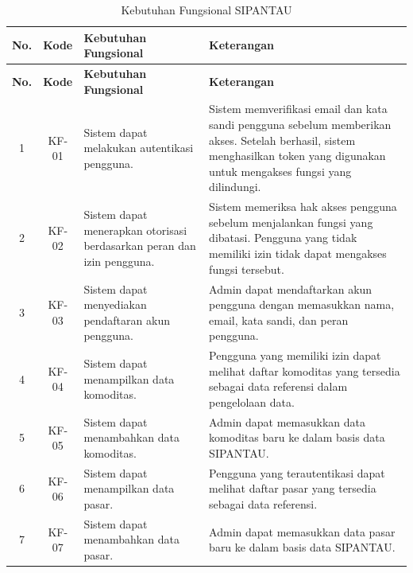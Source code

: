 \begin{longtable}{|c|c|p{3.7cm}|p{7.3cm}|}
    \caption{Kebutuhan Fungsional SIPANTAU}
    \label{tab:kebutuhan-fungsional} \\

    \hline
    \textbf{No.} &
    \textbf{Kode} &
    \textbf{Kebutuhan Fungsional} &
    \textbf{Keterangan} \\
    \hline
    \endfirsthead

    \hline
    \textbf{No.} &
    \textbf{Kode} &
    \textbf{Kebutuhan Fungsional} &
    \textbf{Keterangan} \\
    \hline
    \endhead

    1 & KF-01 &
    Sistem dapat melakukan autentikasi pengguna. &
    Sistem memverifikasi email dan kata sandi pengguna sebelum memberikan akses. Setelah berhasil, sistem menghasilkan token yang digunakan untuk mengakses fungsi yang dilindungi. \\ \hline

    2 & KF-02 &
    Sistem dapat menerapkan otorisasi berdasarkan peran dan izin pengguna. &
    Sistem memeriksa hak akses pengguna sebelum menjalankan fungsi yang dibatasi. Pengguna yang tidak memiliki izin tidak dapat mengakses fungsi tersebut. \\ \hline

    3 & KF-03 &
    Sistem dapat menyediakan pendaftaran akun pengguna. &
    Admin dapat mendaftarkan akun pengguna dengan memasukkan nama, email, kata sandi, dan peran pengguna. \\ \hline

    4 & KF-04 &
    Sistem dapat menampilkan data komoditas. &
    Pengguna yang memiliki izin dapat melihat daftar komoditas yang tersedia sebagai data referensi dalam pengelolaan data. \\ \hline

    5 & KF-05 &
    Sistem dapat menambahkan data komoditas. &
    Admin dapat memasukkan data komoditas baru ke dalam basis data SIPANTAU. \\ \hline

    6 & KF-06 &
    Sistem dapat menampilkan data pasar. &
    Pengguna yang terautentikasi dapat melihat daftar pasar yang tersedia sebagai data referensi. \\ \hline

    7 & KF-07 &
    Sistem dapat menambahkan data pasar. &
    Admin dapat memasukkan data pasar baru ke dalam basis data SIPANTAU. \\ \hline


\end{longtable}
